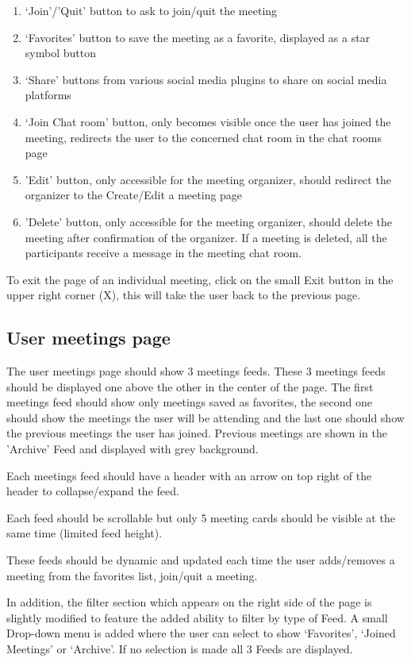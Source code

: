 \documentclass[conference]{IEEEtran}
\begin{document}
\begin{enumerate}
    \item ‘Join’/'Quit' button to ask to join/quit the meeting
    \item ‘Favorites’ button to save the meeting as a favorite, displayed as a star symbol button
    \item ‘Share’ buttons from various social media plugins to share on social media platforms
    \item ‘Join Chat room’ button, only becomes visible once the user has joined the meeting, redirects the user to the concerned chat room in the chat rooms page
    \item 'Edit' button, only accessible for the meeting organizer, should redirect the organizer to the Create/Edit a meeting page
    \item 'Delete' button, only accessible for the meeting organizer, should delete the meeting after confirmation of the organizer.
    If a meeting is deleted, all the participants receive a message in the meeting chat room.
\end{enumerate}

To exit the page of an individual meeting, click on the small Exit button in the upper right corner (X), this will take the user back to the previous page.

\subsection{User meetings page}

The user meetings page should show 3 meetings feeds.
These 3 meetings feeds should be displayed one above the other in the center of the page.
The first meetings feed should show only meetings saved as favorites, the second one should show the meetings the user will be attending and the last one should show the previous meetings the user has joined.
Previous meetings are shown in the 'Archive' Feed and displayed with grey background.

Each meetings feed should have a header with an arrow on top right of the header to collapse/expand the feed.

Each feed should be scrollable but only 5 meeting cards should be visible at the same time (limited feed height).

These feeds should be dynamic and updated each time the user adds/removes a meeting from the favorites list, join/quit a meeting.

In addition, the filter section which appears on the right side of the page is slightly modified to feature the added ability to filter by type of Feed. A small Drop-down menu is added where the user can select to show ‘Favorites’, ‘Joined Meetings’ or ‘Archive’. If no selection is made all 3 Feeds are displayed.
\end{document}
